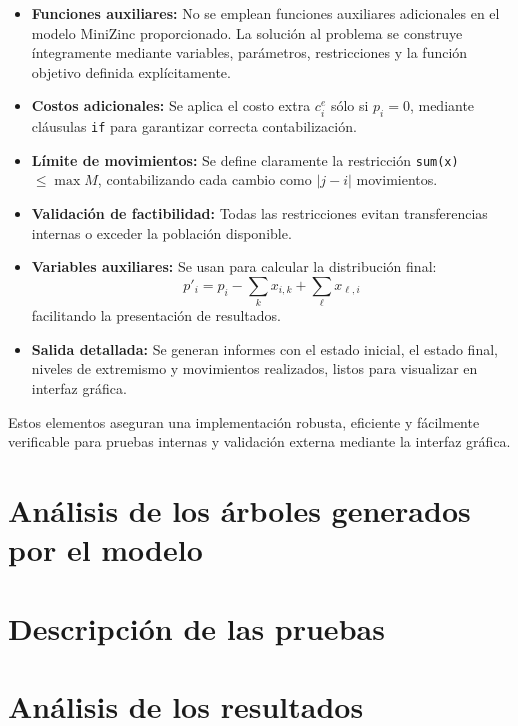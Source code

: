 \documentclass[11pt,letter]{article}
\begin{document}
\begin{itemize}
 \item \textbf{Funciones auxiliares:} No se emplean funciones auxiliares adicionales en el modelo MiniZinc proporcionado. La solución al problema se construye íntegramente mediante variables, parámetros, restricciones y la función objetivo definida explícitamente.
  \item \textbf{Costos adicionales:} Se aplica el costo extra $c^e_i$ sólo si $p_i=0$, mediante cláusulas \texttt{if} para garantizar correcta contabilización.
  \item \textbf{Límite de movimientos:} Se define claramente la restricción \texttt{sum(x)} $\le\max M$, contabilizando cada cambio como $|j-i|$ movimientos.
  \item \textbf{Validación de factibilidad:} Todas las restricciones evitan transferencias internas o exceder la población disponible.
  \item \textbf{Variables auxiliares:} Se usan para calcular la distribución final:
    \[
      p'_i = p_i - \sum_k x_{i,k} + \sum_\ell x_{\ell,i}
    \]
    facilitando la presentación de resultados.
  \item \textbf{Salida detallada:} Se generan informes con el estado inicial, el estado final, niveles de extremismo y movimientos realizados, listos para visualizar en interfaz gráfica.
\end{itemize}

Estos elementos aseguran una implementación robusta, eficiente y fácilmente verificable para pruebas internas y validación externa mediante la interfaz gráfica.

\newpage
\section{Análisis de los árboles generados por el modelo}

\newpage

\section{Descripción de las pruebas}

\newpage

\section{Análisis de los resultados}

\end{document}
